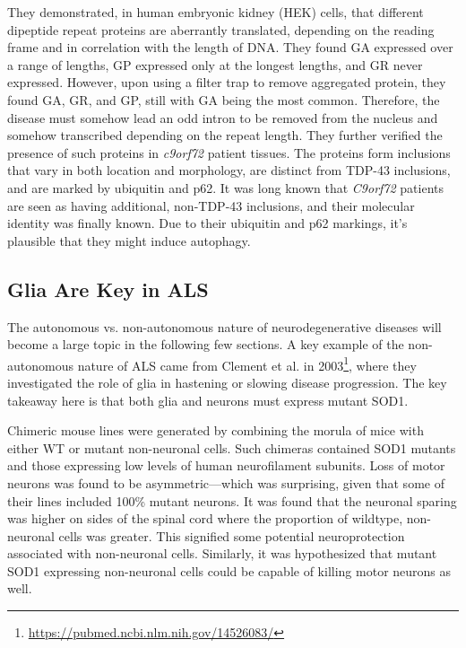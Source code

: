 They demonstrated, in human embryonic kidney (HEK) cells, that different dipeptide repeat proteins are aberrantly translated, depending on the reading frame and in correlation with the length of DNA. They found GA expressed over a range of lengths, GP expressed only at the longest lengths, and GR never expressed. However, upon using a filter trap to remove aggregated protein, they found GA, GR, and GP, still with GA being the most common. Therefore, the disease must somehow lead an odd intron to be removed from the nucleus and somehow transcribed depending on the repeat length. They further verified the presence of such proteins in \textit{c9orf72} patient tissues. The proteins form inclusions that vary in both location and morphology, are distinct from TDP-43 inclusions, and are marked by ubiquitin and p62. It was long known that \textit{C9orf72} patients are seen as having additional, non-TDP-43 inclusions, and their molecular identity was finally known. Due to their ubiquitin and p62 markings, it's plausible that they might induce autophagy.  

\subsection*{Glia Are Key in ALS}

The autonomous vs. non-autonomous nature of neurodegenerative diseases will become a large topic in the following few sections. A key example of the non-autonomous nature of ALS came from Clement et al. in 2003\footnote{\url{https://pubmed.ncbi.nlm.nih.gov/14526083/}}, where they investigated the role of glia in hastening or slowing disease progression. The key takeaway here is that both glia and neurons must express mutant SOD1. \newline

Chimeric mouse lines were generated by combining the morula of mice with either WT or mutant non-neuronal cells. Such chimeras contained SOD1 mutants and those expressing low levels of human neurofilament subunits. Loss of motor neurons was found to be asymmetric---which was surprising, given that some of their lines included 100\% mutant neurons. It was found that the neuronal sparing was higher on sides of the spinal cord where the proportion of wildtype, non-neuronal cells was greater. This signified some potential neuroprotection associated with non-neuronal cells. Similarly, it was hypothesized that mutant SOD1 expressing non-neuronal cells could be capable of killing motor neurons as well. \newline

